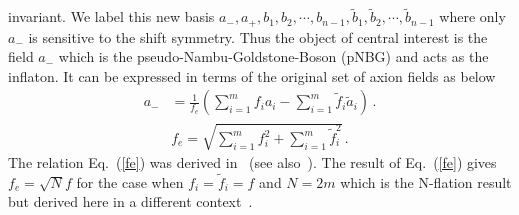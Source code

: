 \documentclass[a4paper,11pt]{article}
\begin{document}
  invariant. We label this new basis $a_-, a_+, b_1, b_2, \cdots, b_{n-1}, \tilde b_1, \tilde b_2, \cdots, \tilde b_{n-1}$
  where only $a_-$ is sensitive to the shift symmetry. Thus the object of central interest is the field $a_-$ which
  is the pseudo-Nambu-Goldstone-Boson (pNBG) and acts
  as the inflaton. It can be expressed in terms of the original set of axion fields as below
  \begin{align}
    {a}_{-} &= \frac{1}{f_e} \left( \sum_{i= 1}^{m} {f}_{i} {a}_{i} - \sum_{i = 1}^{m} {\tilde{f}}_{i} {\tilde{a}}_{i} \right)\,.
    \label{combinations}
  \end{align}
  \begin{align}
    f_e= \sqrt{\sum_{i = 1}^{m} {f}_{i}^{2} + \sum_{i = 1}^{m} {\tilde{f}}_{i}^{2} }\,.
    \label{fe}
  \end{align}
  The relation Eq.~(\ref{fe}) was derived in~\cite{Nath:2017ihp} (see also~\cite{Ernst:2018bib}).
  The result of Eq.~(\ref{fe}) gives $f_e=\sqrt N f$ for the case when $f_i=\tilde f_i=f$ and $N=2m$
  which is the N-flation result but derived here in a different context~\cite{Dimopoulos:2005ac}.
 
\end{document}

